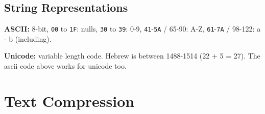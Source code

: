 \documentclass[]{article}
\newcommand\ttt   {\texttt}
\newcommand\fortitle[1] {\Large #1 \normalsize}
\begin{document}
\begin{multicols}{2}
		\subsection{String Representations}
		\textbf{ASCII: }8-bit, \ttt{00} to \ttt{1F}: nulls, \texttt{30} to \texttt{39}: 0-9, \texttt{41}-\texttt{5A} / 65-90: A-Z, \texttt{61}-\texttt{7A} / 98-122: a - b (including). 
		
		\textbf{Unicode: }variable length code. Hebrew is between 1488-1514 (22 + 5 = 27). The ascii code above works for unicode too. 
		
	\end{multicols}
	
	\section{\fortitle{Text Compression}}
\end{document}
